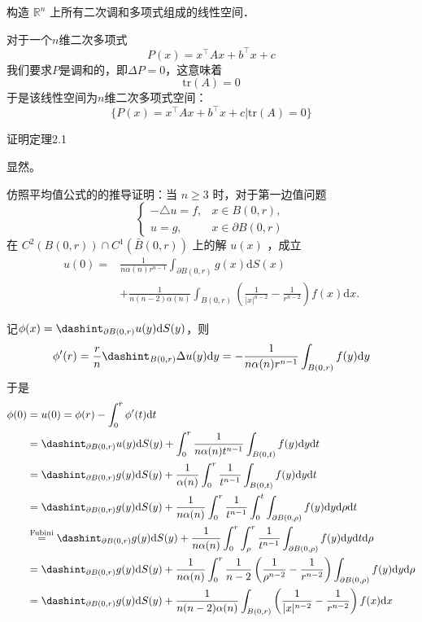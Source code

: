 \documentclass{mynote}
\begin{document}
\begin{exercise}
    构造 $\mathbb{R}^n$ 上所有二次调和多项式组成的线性空间．
\end{exercise}
对于一个$n$维二次多项式
\[
    P(x)=x^\top A x +b^\top x +c
\]
我们要求$P$是调和的，即$\Delta P=0$，这意味着
\[
    \mathrm{tr}(A)=0
\]
于是该线性空间为$n$维二次多项式空间：
\[
    \{P(x)=x^\top A x +b^\top x +c|\mathrm{tr}(A)=0\}
\]
\begin{exercise}
    证明定理2.1
\end{exercise}
显然。
\begin{exercise}\label{exercise:average_value_formula}
    仿照平均值公式的的推导证明：当 $n \geq 3$ 时，对于第一边值问题
$$
\begin{cases}-\triangle u=f, & x \in B(0, r), \\ u=g, & x \in \partial B(0, r)\end{cases}
$$
在 $C^2(B(0, r)) \cap C^1(\bar{B}(0, r))$ 上的解 $u(x)$ ，成立
$$
\begin{aligned}
u(0)= & \frac{1}{n \alpha(n) r^{n-1}} \int_{\partial B(0, r)} g(x) \mathrm{d} S(x) \\
& +\frac{1}{n(n-2) \alpha(n)} \int_{B(0, r)}\left(\frac{1}{|x|^{n-2}}-\frac{1}{r^{n-2}}\right) f(x) \mathrm{d} x .
\end{aligned}
$$
\end{exercise}
记$\phi(x)=\dashint_{\partial B(0,r)}u(y)\mathrm{d}S(y)$，则
\[
    \phi'(r)=\frac{r}{n}\dashint_{B(0,r)}\Delta u(y)\mathrm{d}y=-\frac{1}{n\alpha(n)r^{n-1}}\int_{B(0,r)}f(y)\mathrm{d}y
\]
于是
\begin{align*}
    \phi(0) &= u(0)=\phi(r)-\int_0^r\phi'(t)\mathrm{d}t\\
    &= \dashint_{\partial B(0,r)}u(y)\mathrm{d}S(y)+\int_0^r\frac{1}{n\alpha(n)t^{n-1}}\int_{B(0,t)}f(y)\mathrm{d}y\mathrm{d}t\\
    & = \dashint_{\partial B(0,r)}g(y)\mathrm{d}S(y)+\frac{1}{\alpha(n)}\int_0^r\frac{1}{t^{n-1}}\int_{B(0,t)}f(y)\mathrm{d}y\mathrm{d}t\\
    & = \dashint_{\partial B(0,r)}g(y)\mathrm{d}S(y)+\frac{1}{n\alpha(n)}\int_0^r\frac{1}{t^{n-1}}\int_0^t\int_{\partial B(0,\rho)}f(y)\mathrm{d}y\mathrm{d}\rho\mathrm{d}t\\
    & \overset{\text{Fubini}}{=} \dashint_{\partial B(0,r)}g(y)\mathrm{d}S(y)+\frac{1}{n\alpha(n)}\int_0^r\int_\rho^r\frac{1}{t^{n-1}}\int_{\partial B(0,\rho)}f(y)\mathrm{d}y\mathrm{d}t\mathrm{d}\rho\\
    & = \dashint_{\partial B(0,r)}g(y)\mathrm{d}S(y)+\frac{1}{n\alpha(n)}\int_0^r\frac{1}{n-2}\left(  \frac{1}{\rho^{n-2}}-\frac{1}{r^{n-2}} \right)\int_{\partial B(0,\rho)}f(y)\mathrm{d}y\mathrm{d}\rho\\
    & = \dashint_{\partial B(0,r)}g(y)\mathrm{d}S(y)+\frac{1}{n(n-2)\alpha(n)}\int_{B(0,r)}\left(  \frac{1}{|x|^{n-2}}-\frac{1}{r^{n-2}} \right)f(x)\mathrm{d}x
\end{align*}
\end{document}
